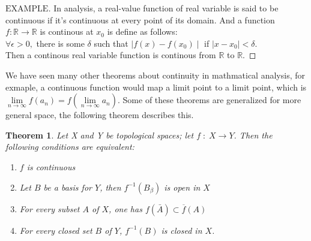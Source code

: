 \documentclass[a4paper, 11pt]{article}
\newtheorem{theorem}{Theorem}
\theoremstyle{remark}
\newenvironment{myexam}
{\renewcommand\qedsymbol{$ $}\begin{proof}[$\mathrm{EXAMPLE}$]}
  {\end{proof}}
\theoremstyle{definition}
\begin{document}
\begin{myexam}
       In analysis, a real-value function of real variable is said to be 
       continuous if it's continuous at every point of its domain. And a function
       $f:\mathbb{R}\rightarrow \mathbb{R}$ is continous at $x_0$ is define as
       follows:\\
       \indent
       $\forall \epsilon >0, $ there is some $\delta$ such that $\mid f(x)-f(x_0)
       \mid $ if $\mid x-x_0 \mid< \delta $.\\
       Then a continous real variable function is continous from $\mathbb{R}$
       to $\mathbb{R}$.
\end{myexam}

We have seen many other theorems about continuity in mathmatical analysis, for 
exmaple, a continuous function would map a limit point to a limit point, which is
$\lim\limits_{n\to \infty}f(a_n)=f(\lim\limits_{n\to \infty}a_n)$. Some of these
theorems are generalized for more general space, the following theorem describes
this.
\begin{theorem}
       Let X and Y be topological spaces; let $f\;:\;X\rightarrow Y$. Then the 
       following conditions are equivalent:
       \begin{enumerate}
              \item $f$ is continuous 
              \item Let $B$ be a basis for $Y$, then $f^{-1}(B_{\beta})$ is open
                      in $X$
              \item For every subset $A$ of $X$, one has $f(\bar{A})\subset 
                      \overline f(A)$
              \item For every closed set $B$ of $Y$, $f^{-1}(B)$ is closed in $X$.
       \end{enumerate}
\end{theorem}
\end{document}
